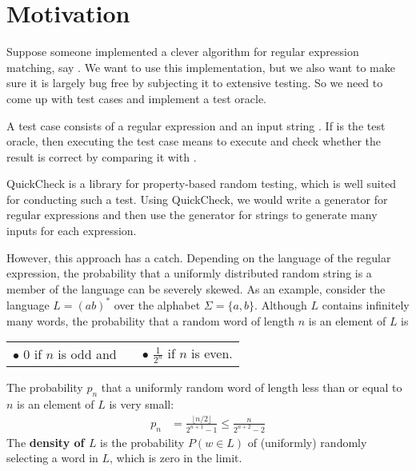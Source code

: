 \section{Motivation}
\label{sec:motivation}

Suppose someone implemented a clever algorithm for
regular expression matching, say  . 
We want to use this implementation, but we also want to 
make sure it is largely bug free by subjecting it to extensive
testing.
So we need to come up with test cases and
implement a test oracle.


A test case consists of a regular expression  and an input
string . If  is the test oracle, then
executing the test case means to execute  and check whether the result is correct by comparing it with
. 

QuickCheck
\cite{DBLP:conf/icfp/ClaessenH00} is a library for property-based random testing, which is well suited for conducting such a test. Using 
QuickCheck, we would write a generator for regular expressions
and then use the generator for strings to generate many inputs for each
expression.

However, this approach has a
catch. Depending on the language of the regular expression, the
probability that a uniformly distributed random string is a member of the language can be 
severely skewed. As an example, consider the language $L = (ab)^*$ over the
alphabet $\Sigma = \{a, b\}$. Although $L$ contains infinitely many
words, the probability that a random word of
length $n$ is an element of $L$ is
\begin{center}
  \begin{tabular}{lcl}
    $\bullet$ $0$ if $n$ is odd and &\qquad& $\bullet$  $\frac{1}{2^n}$ if $n$ is even.
  \end{tabular}
\end{center}
The probability $p_n$ that a uniformly random word of length less than or equal to
$n$ is an element of $L$ is very small:
\begin{align*}
  p_n &= \frac{\lfloor n/2 \rfloor}{2^{n+1} - 1}
        \le \frac{n}{2^{n+2} - 2}
\end{align*}
The \textbf{density of $L$} is the probability $P (w\in L)$ of (uniformly) randomly
selecting a word in $L$, which is zero in the limit.



